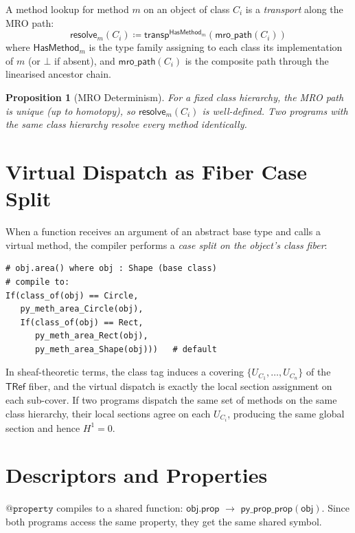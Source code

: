 \documentclass[11pt,a4paper]{report}
\theoremstyle{definition}
\theoremstyle{plain}
\newtheorem{proposition}[definition]{Proposition}
\newcommand{\Hone}{H^1}
\begin{document}
A method lookup for method $m$ on an object of class $C_i$ is a
\emph{transport} along the MRO path:
\[
  \mathsf{resolve}_m(C_i) \coloneqq
  \mathsf{transp}^{\mathsf{HasMethod}_m}(\mathsf{mro\_path}(C_i))
\]
where $\mathsf{HasMethod}_m$ is the type family assigning to each
class its implementation of $m$ (or $\bot$ if absent), and
$\mathsf{mro\_path}(C_i)$ is the composite path through the
linearised ancestor chain.

\begin{proposition}[MRO Determinism]
For a fixed class hierarchy, the MRO path is unique (up to
homotopy), so $\mathsf{resolve}_m(C_i)$ is well-defined.
Two programs with the same class hierarchy resolve every method
identically.
\end{proposition}

\section{Virtual Dispatch as Fiber Case Split}

When a function receives an argument of an abstract base type and
calls a virtual method, the compiler performs a \emph{case split on
the object's class fiber}:

\begin{lstlisting}[caption={Virtual dispatch compilation}]
# obj.area() where obj : Shape (base class)
# compile to:
If(class_of(obj) == Circle,
   py_meth_area_Circle(obj),
   If(class_of(obj) == Rect,
      py_meth_area_Rect(obj),
      py_meth_area_Shape(obj)))   # default
\end{lstlisting}

In sheaf-theoretic terms, the class tag induces a covering
$\{U_{C_1}, \ldots, U_{C_n}\}$ of the $\mathsf{TRef}$ fiber,
and the virtual dispatch is exactly the local section assignment
on each sub-cover.  If two programs dispatch the same set of
methods on the same class hierarchy, their local sections agree
on each $U_{C_i}$, producing the same global section and hence
$\Hone = 0$.

\section{Descriptors and Properties}

$\texttt{@property}$ compiles to a shared function:
$\mathsf{obj.prop}$ $\to$ $\mathsf{py\_prop\_prop}(\mathsf{obj})$.
Since both programs access the same property, they get the same
shared symbol.
\end{document}
